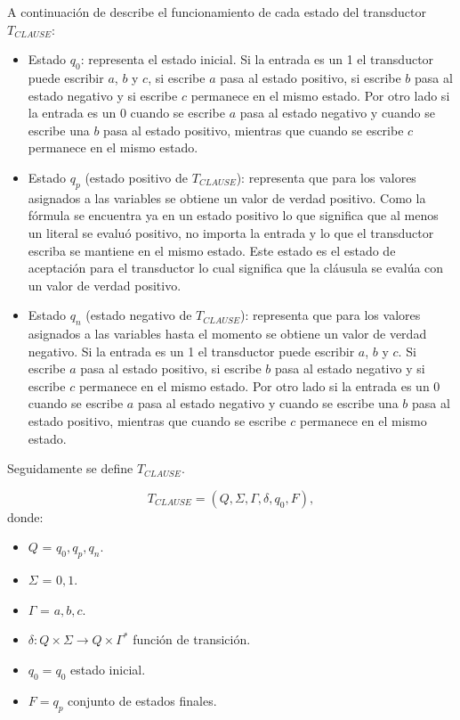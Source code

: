 A continuación de describe el funcionamiento de cada estado del transductor $T_{CLAUSE}$:
\begin{itemize}
    \item Estado $q_0$: representa el estado inicial. Si la entrada es un 1 el transductor puede escribir $a$,
          $b$ y $c$, si escribe $a$ pasa al estado positivo, si escribe $b$ pasa al estado negativo y si escribe $c$
          permanece en el mismo estado. Por otro lado si la entrada es un 0 cuando se escribe $a$ pasa al estado
          negativo y cuando se escribe una $b$ pasa al estado positivo, mientras que cuando se escribe $c$
          permanece en el mismo estado.
          
    \item Estado $q_p$ (estado positivo de $T_{CLAUSE}$): representa que para los valores asignados a las
          variables se obtiene un valor de verdad positivo.  Como la fórmula se encuentra ya en un estado positivo
          lo que significa que al menos un literal se evaluó positivo, no importa la entrada y lo que el transductor
          escriba se mantiene en el mismo estado. Este estado es el estado de aceptación para el transductor lo cual
          significa que la cláusula se evalúa con un valor de verdad positivo.
          
    \item Estado $q_n$ (estado negativo de $T_{CLAUSE}$): representa que para los valores asignados a las variables
          hasta el momento se obtiene un valor de verdad negativo. Si la entrada es un 1 el transductor puede
          escribir $a$, $b$ y $c$. Si escribe $a$ pasa al estado positivo, si escribe $b$ pasa al estado negativo y
          si escribe $c$ permanece en el mismo estado. Por otro lado si la entrada es un 0 cuando se escribe $a$ pasa
          al estado negativo y cuando se escribe una $b$ pasa al estado positivo, mientras que cuando se escribe $c$
          permanece en el mismo estado.
          
\end{itemize}

Seguidamente se define $T_{CLAUSE}$.

\[
    T_{CLAUSE} = (Q, {\Sigma}, \Gamma, \delta, q_{0}, F),
\]
donde:
\begin{itemize}
    \item \(Q\) = ${q_0,q_p,q_n}$.
    \item \(\Sigma\) = ${0,1}$.
    \item \(\Gamma\) = ${a,b,c}$.
    \item \(\delta: Q \times \Sigma \to Q \times \Gamma^*\) función de transición.
    \item \(q_{0} = q_0\) estado inicial.
    \item \(F={q_p}\) conjunto de estados finales.
\end{itemize}

